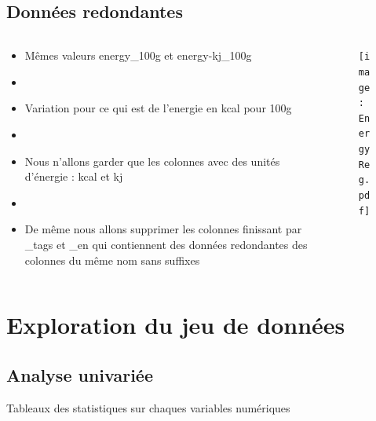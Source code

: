 \subsection{Données redondantes}
\begin{frame}{\insertsubsection}
  \begin{columns}
    \begin{column}{.4\textwidth}
      \begin{itemize}
        \item Mêmes valeurs energy\_100g et energy-kj\_100g
        \item[]
        \item Variation pour ce qui est de l'energie en kcal pour 100g
        \item[]
        \item Nous n'allons garder que les colonnes avec des unités d'énergie : kcal et kj
        \item[]
        \item De même nous allons supprimer les colonnes finissant par \_tags et \_en
              qui contiennent des données redondantes des colonnes du même nom sans suffixes
      \end{itemize}
    \end{column}
    \begin{column}{.6\textwidth}
      \begin{figure}
        \texttt{[image: EnergyReg.pdf]}
      \end{figure}
    \end{column}
  \end{columns}
\end{frame}

\section{Exploration du jeu de données}
\subsection{Analyse univariée}
\begin{frame}{\insertsubsection}
  \begin{table}
    \tiny
    
    
    
    \caption{Tableaux des statistiques sur chaques variables numériques}
  \end{table}
\end{frame}

